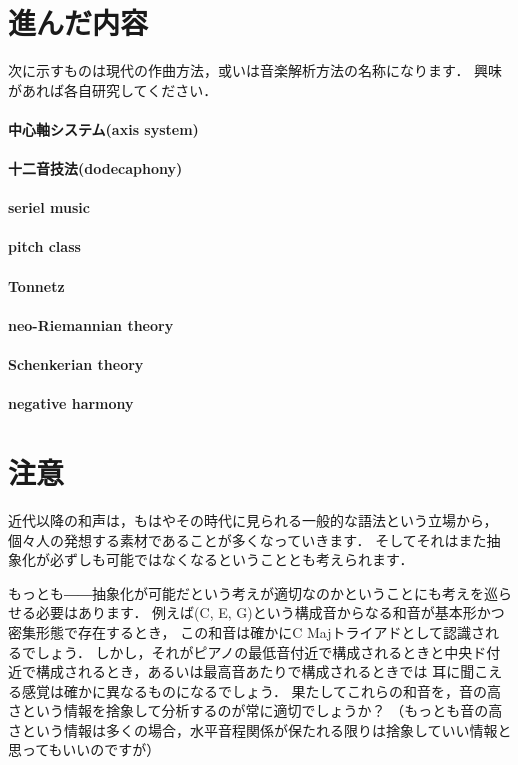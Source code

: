\documentclass[dvipdfmx,uplatex,b5paper,openany,jbase=12Q,nomag*,textwidth-limit=44%
               ]{gachimuchi}
\begin{document}
\section{進んだ内容}
次に示すものは現代の作曲方法，或いは音楽解析方法の名称になります．
興味があれば各自研究してください．
\paragraph{中心軸システム(axis system)}
\paragraph{十二音技法(dodecaphony)}
\paragraph{seriel music}
\paragraph{pitch class}
\paragraph{Tonnetz}
\paragraph{neo-Riemannian theory}
\paragraph{Schenkerian theory}
\paragraph{negative harmony}

\section{注意}
近代以降の和声は，もはやその時代に見られる一般的な語法という立場から，
個々人の発想する素材であることが多くなっていきます．
そしてそれはまた抽象化が必ずしも可能ではなくなるということとも考えられます．

もっとも――抽象化が可能だという考えが適切なのかということにも考えを巡らせる必要はあります．
例えば(C, E, G)という構成音からなる和音が基本形かつ密集形態で存在するとき，
この和音は確かにC Majトライアドとして認識されるでしょう．
しかし，それがピアノの最低音付近で構成されるときと中央ド付近で構成されるとき，あるいは最高音あたりで構成されるときでは
耳に聞こえる感覚は確かに異なるものになるでしょう．
果たしてこれらの和音を，音の高さという情報を捨象して分析するのが常に適切でしょうか？
（もっとも音の高さという情報は多くの場合，水平音程関係が保たれる限りは捨象していい情報と思ってもいいのですが）
\end{document}
